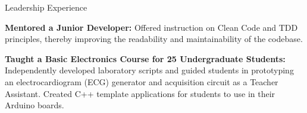 \documentclass{resume} %
\begin{document}



\begin{rSection}{Leadership Experience} 
\vspace{-1.25em}
\item \textbf{Mentored a Junior Developer:} Offered instruction on Clean Code and TDD principles, thereby improving the readability and maintainability of the codebase.
\item \textbf{Taught a Basic Electronics Course for 25 Undergraduate Students:} Independently developed laboratory scripts and guided students in prototyping an electrocardiogram (ECG) generator and acquisition circuit as a Teacher Assistant. Created C++ template applications for students to use in their Arduino boards.
\end{rSection}
\end{document}
